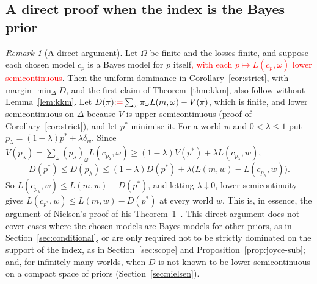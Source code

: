 \documentclass[11pt]{article}
\theoremstyle{definition}
\theoremstyle{remark}
\newtheorem{remark}[theorem]{Remark}
\begin{document}
\subsection{A direct proof when the index is the Bayes prior}\label{sec:direct}
\begin{remark}[A direct argument]\label{rem:direct}
Let $\Omega$ be finite and the losses finite, and suppose each chosen model $c_p$ is a Bayes model for $p$ itself\textcolor{red}{, with each $p\mapsto L(c_p,\omega)$ lower semicontinuous}. Then the uniform dominance in Corollary~\ref{cor:strict}, with margin $\min_\Delta D$, and the first claim of Theorem~\ref{thm:kkm}, also follow without Lemma~\ref{lem:kkm}. Let $D(\pi)\textcolor{red}{:=}\sum_\omega\pi_\omega L(m,\omega)-V(\pi)$, which is finite, and lower semicontinuous on $\Delta$ because $V$ is upper semicontinuous (proof of Corollary~\ref{cor:strict}), and let $p^*$ minimise it. For a world $w$ and $0<\lambda\le1$ put $p_\lambda=(1-\lambda)p^*+\lambda\delta_w$. Since $V(p_\lambda)=\sum_\omega(p_\lambda)_\omega L(c_{p_\lambda},\omega)\ge(1-\lambda)V(p^*)+\lambda L(c_{p_\lambda},w)$,
\[
 D(p^*)\le D(p_\lambda)\le(1-\lambda)D(p^*)+\lambda\bigl(L(m,w)-L(c_{p_\lambda},w)\bigr).
\]
So $L(c_{p_\lambda},w)\le L(m,w)-D(p^*)$, and letting $\lambda\downarrow0$, lower semicontinuity gives $L(c_{p^*},w)\le L(m,w)-D(p^*)$ at every world $w$. This is, in essence, the argument of Nielsen's proof of his Theorem~1~\cite[Appendix~C]{Nielsen}. This direct argument does not cover cases where the chosen models are Bayes models for other priors, as in Section~\ref{sec:conditional}, or are only required not to be strictly dominated on the support of the index, as in Section~\ref{sec:scope} and Proposition~\ref{prop:joyce-sub}; and, for infinitely many worlds, when $D$ is not known to be lower semicontinuous on a compact space of priors (Section~\ref{sec:nielsen}).
\end{remark}
\end{document}
